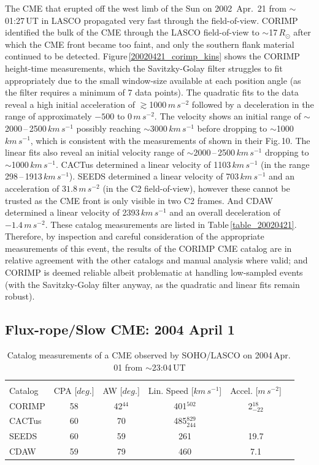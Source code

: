 \documentclass[referee,a4paper,12pt,traditabstract]{swsc}
\begin{document}
\begin{linenumbers}
The CME that erupted off the west limb of the Sun on 2002~Apr.~21 from $\sim$01:27\,UT in LASCO propagated very fast through the field-of-view. CORIMP identified the bulk of the CME through the LASCO field-of-view to $\sim$17\,$R_\odot$ after which the CME front became too faint, and only the southern flank material continued to be detected. Figure\,\ref{20020421_corimp_kins} shows the CORIMP height-time measurements, which the Savitzky-Golay filter struggles to fit appropriately due to the small window-size available at each position angle (as the filter requires a minimum of 7 data points). The quadratic fits to the data reveal a high initial acceleration of $\gtrsim$1000\,$m\,s^{-2}$ followed by a deceleration in the range of approximately $-500$ to $0\,m\,s^{-2}$. The velocity shows an initial range of $\sim$2000\,--\,2500\,$km\,s^{-1}$ possibly reaching $\sim$3000\,$km\,s^{-1}$ before dropping to $\sim$1000\,$km\,s^{-1}$, which is consistent with the measurements of \cite{2009A&A...495..325B} shown in their Fig.\,10. The linear fits also reveal an initial velocity range of $\sim$2000\,--\,2500\,$km\,s^{-1}$ dropping to $\sim$1000\,$km\,s^{-1}$. CACTus determined a linear velocity of 1103$\,km\,s^{-1}$ (in the range 298\,--\,1913\,$km\,s^{-1}$). SEEDS determined a linear velocity of 703\,$km\,s^{-1}$ and an acceleration of $31.8\,m\,s^{-2}$ (in the C2 field-of-view), however these cannot be trusted as the CME front is only visible in two C2 frames. And CDAW determined a linear velocity of 2393$\,km\,s^{-1}$ and an overall deceleration of $-1.4\,m\,s^{-2}$. These catalog measurements are listed in Table\,\ref{table_20020421}. Therefore, by inspection and careful consideration of the appropriate measurements of this event, the results of the CORIMP CME catalog are in relative agreement with the other catalogs and manual analysis where valid; and CORIMP is deemed reliable albeit problematic at handling low-sampled events (with the Savitzky-Golay filter anyway, as the quadratic and linear fits remain robust).


\subsection{Flux-rope/Slow CME: 2004 April 1}


\begin{table}[h]
\begin{tabular}{l*{4}{c}r}
\multicolumn{5}{c}{} \\

Catalog              & CPA [$deg.$] & AW [$deg.$] & Lin. Speed [$km\,s^{-1}$] & Accel. [$m\,s^{-2}$]  \\
\hline
CORIMP   & 58 & 42$^{44}$ & 401$^{502}$ & 2$_{-22}^{18}$ \\
CACTus  & 60 & 70 & 485$_{244}^{829}$ & \\
SEEDS     & 60 & 59 & 261 & 19.7 \\
CDAW      & 59 & 79 & 460 & 7.1 \\
\end{tabular}
\caption{Catalog measurements of a CME observed by SOHO/LASCO on 2004\,Apr.\,01 from $\sim$23:04\,UT}
\label{table_20040401}
\end{table}


\end{linenumbers}
\end{document}
